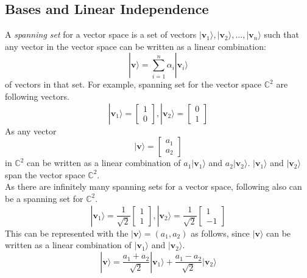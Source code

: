 \documentclass{article}
\begin{document}
\subsection{Bases and Linear Independence}
A \textit{spanning set} for a vector space is a set of vectors $|\mathbf{v}_1\rangle, |\mathbf{v}_2\rangle, \ldots, |\mathbf{v}_n\rangle$ such that any vector in the vector space can be written as a linear combination: 
\begin{equation}
    |\mathbf{v}\rangle = \sum_{i=1}^n \alpha_i |\mathbf{v}_i\rangle
\end{equation}
of vectors in that set. 
For example, spanning set for the vector space $\mathbb{C}^2$ are following vectors.
\begin{equation}
    |\mathbf{v}_1\rangle =
    \begin{bmatrix}
        1 \\
        0
    \end{bmatrix}
    , |\mathbf{v}_2\rangle =
    \begin{bmatrix}
        0 \\
        1
    \end{bmatrix}
\end{equation}
As any vector 
\begin{equation}
    |\mathbf{v}\rangle =
    \begin{bmatrix}
        a_1 \\
        a_2
    \end{bmatrix}
\end{equation}
in $\mathbb{C}^2$ can be written as a linear combination of $a_1|\mathbf{v}_1\rangle$ and $a_2|\mathbf{v}_2\rangle$.
$|\mathbf{v}_1\rangle$ and $|\mathbf{v}_2\rangle$ span the vector space $\mathbb{C}^2$. \\
As there are infinitely many spanning sets for a vector space, following also can be a spanning set for $\mathbb{C}^2$. \\
\begin{equation}
    |\mathbf{v}_1\rangle =
    \frac{1}{\sqrt{2}}
    \begin{bmatrix}
        1 \\
        1   
    \end{bmatrix}
    , |\mathbf{v}_2\rangle =
    \frac{1}{\sqrt{2}}
    \begin{bmatrix}
        1 \\
        -1
    \end{bmatrix}
\end{equation}
This can be represented with the $|\mathbf{v}\rangle = (a_1,a_2)$ as follows, since $|\mathbf{v}\rangle$ can be written as a linear combination of $|\mathbf{v}_1\rangle$ and $|\mathbf{v}_2\rangle$.
\begin{equation}
    |\mathbf{v}\rangle = \frac{a_1 + a_2}{\sqrt{2}}|\mathbf{v}_1\rangle + \frac{a_1 - a_2}{\sqrt{2}}|\mathbf{v}_2\rangle
\end{equation}
\end{document}
